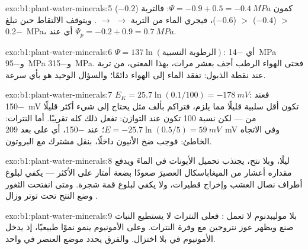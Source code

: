 \begin{solution}{exo:b1:plant-water-minerals:5}
كمون  $\Psi = -0.9 + 0.5 = \qty{-0.4}{MPa}$: فالتربة ($-0.2$) $>$ 
($-0.4$) $>$  ($-0.6$)، فيجري الماء من التربة $\to$  $\to$
. ويتوقف الالتقاط حين تبلغ  \qty{-0.2}{MPa}، أي عند
$\Psi_p = -0.2 + 0.9 = \qty{0.7}{MPa}$.
\end{solution}

\begin{solution}{exo:b1:plant-water-minerals:6}
$\Psi = 137\ln(\text{الرطوبة النسبية})$: أي \qty{-14}{MPa} و\qty{-95}{MPa}
و\qty{-315}{MPa}. فحتى الهواء الرطب أجف بعشر مرات، بهذا المعنى، من
تربة عند نقطة الذبول:  تفقد الماء إلى الهواء دائمًا؛ والسؤال
الوحيد هو بأي سرعة.
\end{solution}

\begin{solution}{exo:b1:plant-water-minerals:7}
$E_K = 25.7\ln(0.1/100) = \qty{-178}{mV}$: فعند \qty{-150}{mV} تكون
 أقل سلبية قليلًا مما يلزم، فتراكم بألف مثل يحتاج إلى شيء
أكثر قليلًا من  --- لكن نسبة 100 تكون عند التوازن: 
تفعل ذلك كله تقريبًا. أما النترات: $E = -25.7\ln(0.5/5)
= \qty{+59}{mV}$؛  عند \qty{-150}{}، أي على بعد \qty{209}{mV}
وفي الاتجاه الخاطئ: فوجب ضخ الأنيون داخلًا، بنقل مشترك مع البروتون.
\end{solution}

\begin{solution}{exo:b1:plant-water-minerals:8}
ليلًا، وبلا نتح، يجتذب تحميل الأيونات في  الماءَ ويدفع  مقداره أعشار من الميغاباسكال العصيرَ صعودًا بضعة أمتار على
الأكثر --- يكفي لبلوغ أطراف نصال العشب وإخراج قطيرات، ولا يكفي
لبلوغ قمة شجرة. ومتى انفتحت الثغور وضع النتح  تحت توتر وزال
.
\end{solution}

\begin{solution}{exo:b1:plant-water-minerals:9}
بلا موليبدنوم لا تعمل : فعلى النترات لا يستطيع النبات
صنع  ويظهر عوز نتروجين مع وفرة النترات. وعلى الأمونيوم
ينمو نموًا طبيعيًا، إذ يدخل الأمونيوم في  بلا
اختزال. والفرق يحدد موضع العنصر في  واحد.
\end{solution}

